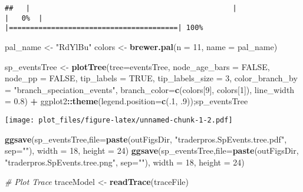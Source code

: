 \documentclass[
]{article}
\newenvironment{Shaded}{\begin{snugshade}}{\end{snugshade}}
\newcommand{\AttributeTok}[1]{\textcolor[rgb]{0.13,0.29,0.53}{#1}}
\newcommand{\CommentTok}[1]{\textcolor[rgb]{0.56,0.35,0.01}{\textit{#1}}}
\newcommand{\ConstantTok}[1]{\textcolor[rgb]{0.56,0.35,0.01}{#1}}
\newcommand{\DecValTok}[1]{\textcolor[rgb]{0.00,0.00,0.81}{#1}}
\newcommand{\FloatTok}[1]{\textcolor[rgb]{0.00,0.00,0.81}{#1}}
\newcommand{\FunctionTok}[1]{\textcolor[rgb]{0.13,0.29,0.53}{\textbf{#1}}}
\newcommand{\NormalTok}[1]{#1}
\newcommand{\OtherTok}[1]{\textcolor[rgb]{0.56,0.35,0.01}{#1}}
\newcommand{\SpecialCharTok}[1]{\textcolor[rgb]{0.81,0.36,0.00}{\textbf{#1}}}
\newcommand{\StringTok}[1]{\textcolor[rgb]{0.31,0.60,0.02}{#1}}
\begin{document}
\begin{verbatim}
##   |                                                |                                        |   0%  |                                                |========================================| 100%
\end{verbatim}

\begin{Shaded}
\begin{Highlighting}[]
\NormalTok{pal\_name }\OtherTok{\textless{}{-}} \StringTok{"RdYlBu"}
\NormalTok{colors }\OtherTok{\textless{}{-}} \FunctionTok{brewer.pal}\NormalTok{(}\AttributeTok{n =} \DecValTok{11}\NormalTok{, }\AttributeTok{name =}\NormalTok{ pal\_name)}

\NormalTok{sp\_eventsTree }\OtherTok{\textless{}{-}} \FunctionTok{plotTree}\NormalTok{(}\AttributeTok{tree=}\NormalTok{eventsTree,}
         \AttributeTok{node\_age\_bars =} \ConstantTok{FALSE}\NormalTok{,}
         \AttributeTok{node\_pp =} \ConstantTok{FALSE}\NormalTok{,}
         \AttributeTok{tip\_labels =} \ConstantTok{TRUE}\NormalTok{,}
         \AttributeTok{tip\_labels\_size =} \DecValTok{3}\NormalTok{,}
         \AttributeTok{color\_branch\_by =} \StringTok{"branch\_speciation\_events"}\NormalTok{,}
         \AttributeTok{branch\_color=}\FunctionTok{c}\NormalTok{(colors[}\DecValTok{9}\NormalTok{], colors[}\DecValTok{1}\NormalTok{]),}
         \AttributeTok{line\_width =} \FloatTok{0.8}\NormalTok{) }\SpecialCharTok{+}
\NormalTok{  ggplot2}\SpecialCharTok{::}\FunctionTok{theme}\NormalTok{(}\AttributeTok{legend.position=}\FunctionTok{c}\NormalTok{(.}\DecValTok{1}\NormalTok{, .}\DecValTok{9}\NormalTok{));sp\_eventsTree         }
\end{Highlighting}
\end{Shaded}

\texttt{[image: plot\_files/figure-latex/unnamed-chunk-1-2.pdf]}

\begin{Shaded}
\begin{Highlighting}[]
\FunctionTok{ggsave}\NormalTok{(sp\_eventsTree,}\AttributeTok{file=}\FunctionTok{paste}\NormalTok{(outFigsDir, }\StringTok{"traderpros.SpEvents.tree.pdf"}\NormalTok{, }\AttributeTok{sep=}\StringTok{""}\NormalTok{), }\AttributeTok{width =} \DecValTok{18}\NormalTok{, }\AttributeTok{height =} \DecValTok{24}\NormalTok{) }
\FunctionTok{ggsave}\NormalTok{(sp\_eventsTree,}\AttributeTok{file=}\FunctionTok{paste}\NormalTok{(outFigsDir, }\StringTok{"traderpros.SpEvents.tree.png"}\NormalTok{, }\AttributeTok{sep=}\StringTok{""}\NormalTok{), }\AttributeTok{width =} \DecValTok{18}\NormalTok{, }\AttributeTok{height =} \DecValTok{24}\NormalTok{) }


\CommentTok{\# Plot Trace}
\NormalTok{traceModel }\OtherTok{\textless{}{-}} \FunctionTok{readTrace}\NormalTok{(traceFile)}
\end{Highlighting}
\end{Shaded}
\end{document}
